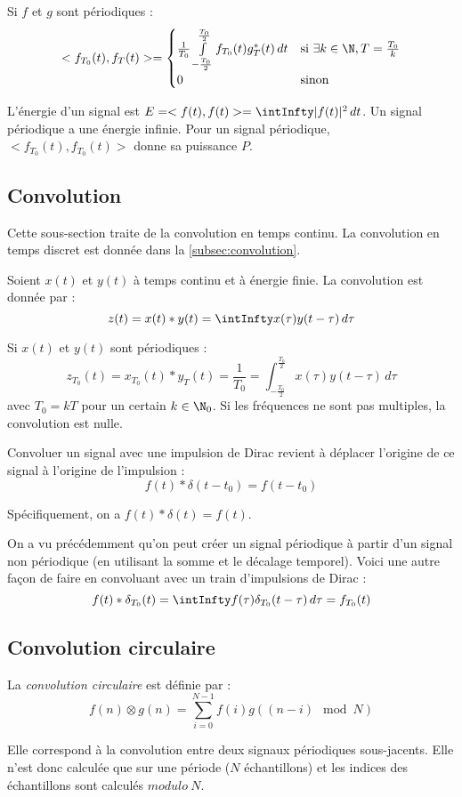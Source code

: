         Si $f$ et $g$ sont périodiques :
        $$
            <f_{T_0}(t), f_T(t)> = \begin{cases}
                \frac{1}{T_0} \int\limits_{-\frac{T_0}{2}}^{\frac{T_0}{2}} f_{T_0}(t)g_T^*(t)\,dt & \mbox{si } \exists k \in \N, T = \frac{T_0}{k}\\
                0 & \mbox{sinon}
            \end{cases}
        $$

        L'énergie d'un signal est $E = <f(t), f(t)> = \intInfty|f(t)|^2\,dt$. Un signal périodique a une énergie infinie. Pour un signal périodique, $<f_{T_0}(t), f_{T_0}(t)>$ donne sa puissance $P$.

    \subsection{Convolution}
        \begin{remarque}
            Cette sous-section traite de la convolution en temps continu. La convolution en temps discret est donnée dans la \autoref{subsec:convolution}.
        \end{remarque}
        
        Soient $x(t)$ et $y(t)$ à temps continu et à énergie finie. La convolution est donnée par :
        $$
            z(t) = x(t) * y(t) = \intInfty x(\tau)y(t-\tau)\, d\tau
        $$

        Si $x(t)$ et $y(t)$ sont périodiques :
        $$
            z_{T_0}(t) = x_{T_0}(t) * y_T(t) = \frac{1}{T_0} = \int_{-\frac{T_0}{2}}^{\frac{T_0}{2}} x(\tau)y(t-\tau)\,d\tau
        $$
        avec $T_0 = kT$  pour un certain $k \in \N_0$. Si les fréquences ne sont pas multiples, la convolution est nulle.

        Convoluer un signal avec une impulsion de Dirac revient à déplacer l'origine de ce signal à l'origine de l'impulsion :
        $$
            f(t)*\delta(t-t_0) = f(t-t_0)
        $$

        Spécifiquement, on a $f(t) * \delta(t) = f(t)$.

        On a vu précédemment qu'on peut créer un signal périodique à partir d'un signal non périodique (en utilisant la somme et le décalage temporel). Voici une autre façon de faire en convoluant avec un train d'impulsions de Dirac :
        $$
            f(t)*\delta_{T_0}(t) = \intInfty f(\tau)\delta_{T_0}(t-\tau)\,d\tau = f_{T_0}(t)
        $$

    \subsection{Convolution circulaire}
        La \textit{convolution circulaire} est définie par :
        $$
            f(n) \otimes g(n) = \sum_{i=0}^{N-1} f(i)g((n-i) \mod{N})
        $$

        Elle correspond à la convolution entre deux signaux périodiques sous-jacents. Elle n'est donc calculée que sur une période ($N$ échantillons) et les indices des échantillons sont calculés $modulo\ N$.